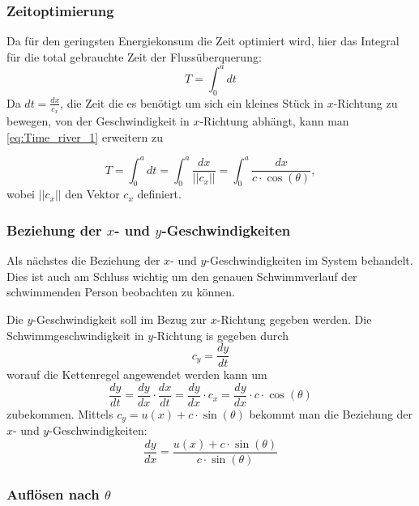 \subsubsection{Zeitoptimierung}

Da für den geringsten Energiekonsum die Zeit optimiert wird, hier das Integral für die total gebrauchte Zeit der Flussüberquerung:
\begin{equation}
    T = \int_0^adt \label{eq:Time_river_1}
\end{equation}
Da \(dt = \frac{dx}{c_x}\), die Zeit die es benötigt um sich ein kleines Stück in \(x\)-Richtung zu bewegen, von der Geschwindigkeit in \(x\)-Richtung abhängt, kann man \eqref{eq:Time_river_1} erweitern zu

\begin{equation}
    T = \int_0^adt = \int_0^a\frac{dx}{||c_x||} = \int_0^a\frac{dx}{c\cdot \cos(\theta)} \label{eq:Time_river_2},
\end{equation}
wobei \(||c_x||\) den Vektor \(c_x\) definiert. 


\subsubsection{Beziehung der \(x\)- und \(y\)-Geschwindigkeiten}

Als nächstes die Beziehung der \(x\)- und \(y\)-Geschwindigkeiten im System behandelt. Dies ist auch am Schluss wichtig um den genauen Schwimmverlauf der schwimmenden Person beobachten zu können.

Die \(y\)-Geschwindigkeit soll im Bezug zur \(x\)-Richtung gegeben werden. Die Schwimmgeschwindigkeit in \(y\)-Richtung is gegeben durch
\begin{equation}
    c_y = \frac{dy}{dt}
\end{equation}
worauf die Kettenregel angewendet werden kann um
\begin{equation}
    \frac{dy}{dt} = \frac{dy}{dx} \cdot \frac{dx}{dt} = \frac{dy}{dx}\cdot c_x = \frac{dy}{dx}\cdot c\cdot \cos(\theta)
\end{equation}
zubekommen. Mittels \(c_y = u(x) + c\cdot \sin(\theta)\) bekommt man die Beziehung der \(x\)- und \(y\)-Geschwindigkeiten:
\begin{equation}
    \frac{dy}{dx} = \frac{u(x) + c \cdot \sin(\theta)}{c \cdot \sin(\theta)} \label{eq:dy_dx}
\end{equation}



\subsubsection{Auflösen nach \(\theta\)}

